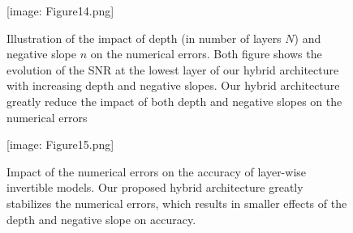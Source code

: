 \documentclass[twocolumn]{bmcart}
\def\texttt{[image: ]}
\begin{document}
\begin{backmatter}
\begin{figure}[t]
\texttt{[image: Figure14.png]}
\caption{
Illustration of the impact of depth (in number of layers $N$) and negative slope $n$ on the numerical errors.
Both figure shows the evolution of the SNR at the lowest layer of our hybrid architecture with increasing depth and negative slopes.
Our hybrid architecture greatly reduce the impact of both depth and negative slopes on the numerical errors
}
\end{figure}

\begin{figure}[t]
\texttt{[image: Figure15.png]}
\caption{
Impact of the numerical errors on the accuracy of layer-wise invertible models.
Our proposed hybrid architecture greatly stabilizes the numerical errors,
which results in smaller effects of the depth and negative slope on accuracy.
}
\end{figure}

\end{backmatter}
\]
\end{document}
